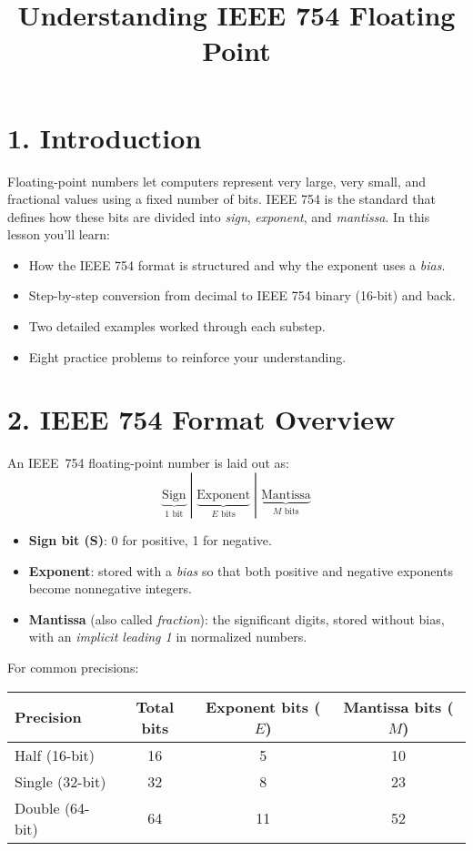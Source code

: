 \documentclass[12pt]{article}
\title{Understanding IEEE 754 Floating Point}
\author{}
\date{}
\begin{document}
\maketitle

\section*{1. Introduction}
Floating-point numbers let computers represent very large, very small, and fractional values using a fixed number of bits. IEEE 754 is the standard that defines how these bits are divided into \emph{sign}, \emph{exponent}, and \emph{mantissa}. In this lesson you'll learn:
\begin{itemize}
  \item How the IEEE 754 format is structured and why the exponent uses a \emph{bias}.
  \item Step-by-step conversion from decimal to IEEE 754 binary (16-bit) and back.
  \item Two detailed examples worked through each substep.
  \item Eight practice problems to reinforce your understanding.
\end{itemize}

\section*{2. IEEE 754 Format Overview}
An IEEE~754 floating-point number is laid out as:
\[
\underbrace{\text{Sign}}_{1\text{ bit}}
\;|\;
\underbrace{\text{Exponent}}_{E\text{ bits}}
\;|\;
\underbrace{\text{Mantissa}}_{M\text{ bits}}
\]
\begin{itemize}
  \item \textbf{Sign bit (S)}: 0 for positive, 1 for negative.
  \item \textbf{Exponent}: stored with a \emph{bias} so that both positive and negative exponents become nonnegative integers.
  \item \textbf{Mantissa} (also called \emph{fraction}): the significant digits, stored without bias, with an \emph{implicit leading 1} in normalized numbers.
\end{itemize}

For common precisions:
\begin{center}
\begin{tabular}{l|c|c|c}
Precision & Total bits & Exponent bits ($E$) & Mantissa bits ($M$) \\
\hline
Half (16-bit)   & 16 & 5 & 10 \\
Single (32-bit) & 32 & 8 & 23 \\
Double (64-bit) & 64 & 11 & 52 \\
\end{tabular}
\end{center}
\end{document}
